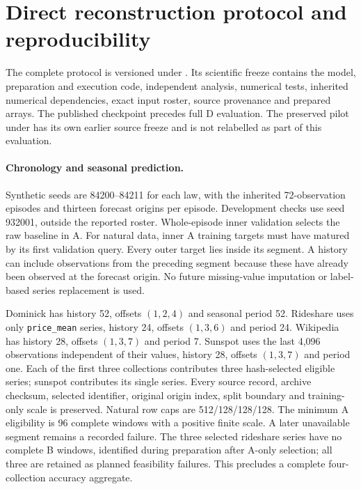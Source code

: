 \section{Direct reconstruction protocol and reproducibility}
\label{app:direct-protocol}

The complete protocol is versioned under
. Its scientific
freeze contains the model, preparation and execution code, independent
analysis, numerical tests, inherited numerical dependencies, exact input
roster, source provenance and prepared arrays. The published checkpoint
precedes full D evaluation. The preserved pilot under
 has its own earlier source freeze
and is not relabelled as part of this evaluation.

\paragraph{Chronology and seasonal prediction.}
Synthetic seeds are 84200--84211 for each law, with the inherited
72-observation episodes and thirteen forecast origins per episode.
Development checks use seed 932001, outside the reported roster.
Whole-episode inner validation selects the raw baseline in A. For natural
data, inner A training targets must have matured by its first
validation query. Every outer target lies inside its segment. A history
can include observations from the preceding segment because these have
already been observed at the forecast origin. No future missing-value
imputation or label-based series replacement is used.

Dominick has history 52, offsets $(1,2,4)$ and seasonal period 52.
Rideshare uses only \texttt{price\_mean} series, history 24, offsets
$(1,3,6)$ and period 24. Wikipedia has history 28, offsets $(1,3,7)$ and
period 7. Sunspot uses the last 4,096 observations independent of their
values, history 28, offsets $(1,3,7)$ and period one. Each of the first
three collections contributes three hash-selected eligible series;
sunspot contributes its single series. Every source record, archive
checksum, selected identifier, original origin index, split boundary and
training-only scale is preserved. Natural row caps are 512/128/128/128.
The minimum A eligibility is 96 complete windows with a positive finite
scale. A later unavailable segment remains a recorded failure. The three selected
rideshare series have no complete B windows, identified during preparation
after A-only selection; all three are retained as planned feasibility
failures. This precludes a complete four-collection accuracy aggregate.

